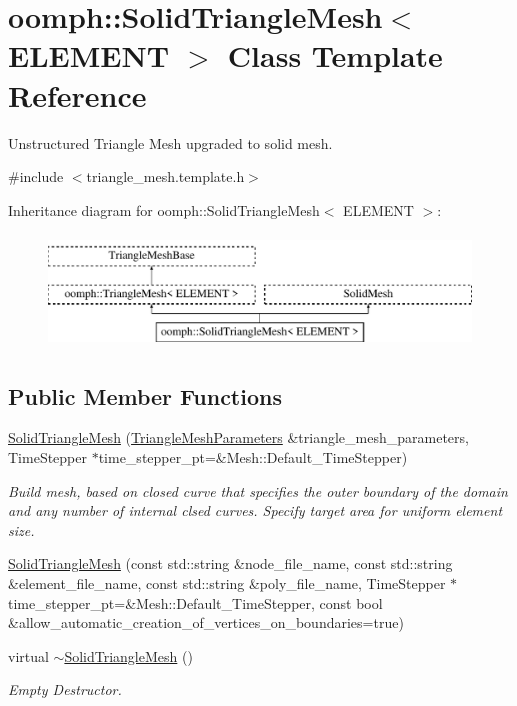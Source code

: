 \hypertarget{classoomph_1_1SolidTriangleMesh}{}\section{oomph\+:\+:Solid\+Triangle\+Mesh$<$ E\+L\+E\+M\+E\+NT $>$ Class Template Reference}
\label{classoomph_1_1SolidTriangleMesh}


Unstructured Triangle Mesh upgraded to solid mesh.  




{\ttfamily \#include $<$triangle\+\_\+mesh.\+template.\+h$>$}

Inheritance diagram for oomph\+:\+:Solid\+Triangle\+Mesh$<$ E\+L\+E\+M\+E\+NT $>$\+:\begin{figure}[H]
\begin{center}
\leavevmode
\includegraphics[height=3.000000cm]{classoomph_1_1SolidTriangleMesh}
\end{center}
\end{figure}
\subsection*{Public Member Functions}
\begin{DoxyCompactItemize}
\item 
\hyperlink{classoomph_1_1SolidTriangleMesh_a0319b61fc3444922e2b55c9978f381f3}{Solid\+Triangle\+Mesh} (\hyperlink{classoomph_1_1TriangleMeshParameters}{Triangle\+Mesh\+Parameters} \&triangle\+\_\+mesh\+\_\+parameters, Time\+Stepper $\ast$time\+\_\+stepper\+\_\+pt=\&Mesh\+::\+Default\+\_\+\+Time\+Stepper)
\begin{DoxyCompactList}\small\item\em Build mesh, based on closed curve that specifies the outer boundary of the domain and any number of internal clsed curves. Specify target area for uniform element size. \end{DoxyCompactList}\item 
\hyperlink{classoomph_1_1SolidTriangleMesh_a15a943bd43fece042e2ffdefc8ceb0f4}{Solid\+Triangle\+Mesh} (const std\+::string \&node\+\_\+file\+\_\+name, const std\+::string \&element\+\_\+file\+\_\+name, const std\+::string \&poly\+\_\+file\+\_\+name, Time\+Stepper $\ast$time\+\_\+stepper\+\_\+pt=\&Mesh\+::\+Default\+\_\+\+Time\+Stepper, const bool \&allow\+\_\+automatic\+\_\+creation\+\_\+of\+\_\+vertices\+\_\+on\+\_\+boundaries=true)
\item 
virtual \hyperlink{classoomph_1_1SolidTriangleMesh_a5ab5a2ac3aee1a80fbb72b27fc929783}{$\sim$\+Solid\+Triangle\+Mesh} ()
\begin{DoxyCompactList}\small\item\em Empty Destructor. \end{DoxyCompactList}\end{DoxyCompactItemize}
